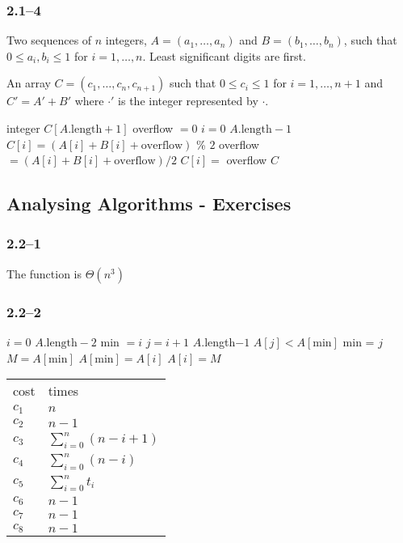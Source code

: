 \subsubsection*{2.1--4}

\begin{inp}
	Two sequences of $n$ integers, $A=(a_{1},\ldots,a_{n})$ and $B=(b_{1},\ldots,b_{n})$, such that $0\leq a_{i},b_{i}\leq 1$ for $i=1,\ldots,n$. Least significant digits are first.
\end{inp}

\begin{outp}
	An array $C=(c_{1},\ldots,c_{n},c_{n+1})$ such that $0\leq c_{i}\leq 1$ for $i=1,\ldots,n+1$ and $C'=A'+B'$ where $\cdot'$ is the integer represented by $\cdot$.
\end{outp}

\begin{codebox}
	\li \Define integer $C[A.\text{length}+1]$
	\li overflow $=0$
	\li	\For $i = 0$ \To $A.\text{length}-1$
	\li \Do
				$C[i] = (A[i] + B[i] + \text{overflow})$ \% $2$
	\li		overflow $= (A[i] + B[i] + \text{overflow})/2$
			\End
	\li $C[i] =$ overflow
	\li \Return $C$
\end{codebox}

\subsection{Analysing Algorithms - Exercises}

\subsubsection*{2.2--1}

The function is $\Theta(n^{3})$

\subsubsection*{2.2--2}

\begin{multicols}{2}
	\begin{codebox}
		\li	\For $i = 0$ \To $A.\text{length}-2$
		\li	\Do
					min $= i$
		\li		\For $j = i+1$ \To $A.$length$-1$
		\li		\Do
						\If $A[j] < A[\text{min}]$
		\li			\Then
							min = $j$
						\End
					\End
		\li $M = A[\text{min}]$
		\li $A[\text{min}] = A[i]$
		\li $A[i] = M$
					\End
		\end{codebox}
		\columnbreak
		\begin{tabular}{ l l }
			cost & times\\[4pt]
			$c_{1}$ & $n$\\
			$c_{2}$ & $n-1$\\
			$c_{3}$ & $\sum_{i=0}^{n}(n-i+1)$\\
			$c_{4}$ & $\sum_{i=0}^{n}(n-i)$\\
			$c_{5}$ & $\sum_{i=0}^{n}t_{i}$\\
			$c_{6}$ & $n-1$\\
			$c_{7}$ & $n-1$\\
			$c_{8}$ & $n-1$
		\end{tabular}
\end{multicols}


